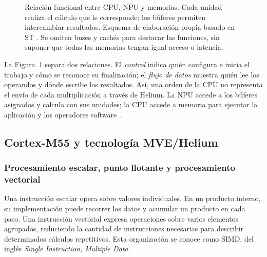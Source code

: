 \begin{figure}[H]
\caption{Relación funcional entre CPU, NPU y memorias. Cada unidad realiza el cálculo que le corresponde; los búferes permiten intercambiar resultados. Esquema de elaboración propia basado en ST \cite{cap4_stconcepts}. Se omiten buses y cachés para destacar las funciones, sin suponer que todas las memorias tengan igual acceso o latencia.}\label{fig:hw}
\end{figure}

La Figura~\ref{fig:hw} separa dos relaciones. El \emph{control} indica quién configura e inicia el trabajo y cómo se reconoce su finalización; el \emph{flujo de datos} muestra quién lee los operandos y dónde escribe los resultados. Así, una orden de la CPU no representa el envío de cada multiplicación a través de Helium. La NPU accede a los búferes asignados y calcula con sus unidades; la CPU accede a memoria para ejecutar la aplicación y los operadores software \cite{cap4_stconcepts}.

\subsection{Cortex-M55 y tecnología MVE/Helium}\label{sec:cap4_helium}
\subsubsection{Procesamiento escalar, punto flotante y procesamiento vectorial}
Una instrucción escalar opera sobre valores individuales. En un producto interno, su implementación puede recorrer los datos y acumular un producto en cada paso. Una instrucción vectorial expresa operaciones sobre varios elementos agrupados, reduciendo la cantidad de instrucciones necesarias para describir determinados cálculos repetitivos. Esta organización se conoce como SIMD, del inglés \textit{Single Instruction, Multiple Data}.

